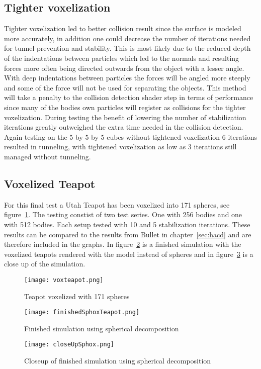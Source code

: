 \subsection{Tighter voxelization}
Tighter voxelization led to better collision result since the surface is modeled
more accurately, in addition one could decrease the number of iterations needed
for tunnel prevention and stability. This is most likely due to the reduced depth
of the indentations between particles which led to the normals and resulting forces more often
being directed outwards from the object with a lesser angle.
 With deep indentations between particles the forces will be angled more steeply and
  some of the force will not be used for separating the objects.
This method will take a penalty to the collision detection shader step in
terms of performance since many of the bodies own particles will register as collisions
for the tighter voxelization. During testing the benefit of lowering the number of
stabilization iterations greatly outweighed the extra time needed in the collision
detection. Again testing on the 5 by 5 by 5 cubes without tightened voxelization 6 iterations resulted in
tunneling, with tightened voxelization as low as 3 iterations still managed without tunneling.

\subsection{Voxelized Teapot}\label{sec:teapot}
For this final test a Utah Teapot has been voxelized into 171 spheres, see figure~\ref{fig:voxteapot}.
The testing constist of two test series. One with 256 bodies and one with 512 bodies.
Each setup tested with 10 and 5 stabilization iterations. These results can be compared to the
results from Bullet in chapter~\ref{sec:hacd} and are therefore included in the graphs.
In figure~\ref{fig:voxFinish} is a finished simulation with the voxelized teapots rendered
with the model instead of spheres and
in figure~\ref{fig:voxCloseup} is a close up of the simulation.

\begin{figure}[H]
  \centering
  \texttt{[image: voxteapot.png]}
  \caption{Teapot voxelized with 171 spheres}
  \label{fig:voxteapot}
\end{figure}

\begin{figure}[H]
  \centering
  \texttt{[image: finishedSphoxTeapot.png]}
  \caption{Finished simulation using spherical decomposition}
  \label{fig:voxFinish}
\end{figure}
\begin{figure}[H]
  \centering
  \texttt{[image: closeUpSphox.png]}
  \caption{Closeup of finished simulation using spherical decomposition}
  \label{fig:voxCloseup}
\end{figure}


